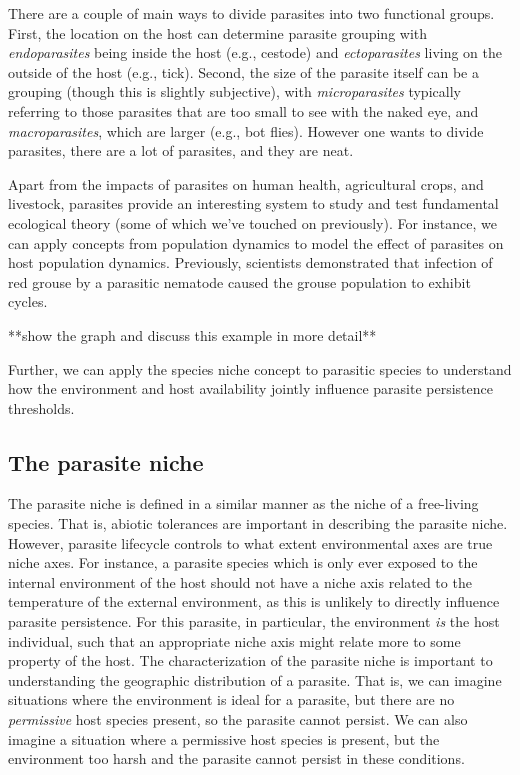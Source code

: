 \documentclass[12pt]{article}
\begin{document}
There are a couple of main ways to divide parasites into two functional groups. First, the location on the host can determine parasite grouping with \textit{endoparasites} being inside the host (e.g., cestode) and \textit{ectoparasites} living on the outside of the host (e.g., tick). Second, the size of the parasite itself can be a grouping (though this is slightly subjective), with \textit{microparasites} typically referring to those parasites that are too small to see with the naked eye, and \textit{macroparasites}, which are larger (e.g., bot flies). However one wants to divide parasites, there are a lot of parasites, and they are neat. 


Apart from the impacts of parasites on human health, agricultural crops, and livestock, parasites provide an interesting system to study and test fundamental ecological theory (some of which we've touched on previously). For instance, we can apply concepts from population dynamics to model the effect of parasites on host population dynamics. Previously, scientists demonstrated that infection of red grouse by a parasitic nematode caused the grouse population to exhibit cycles. 


**show the graph and discuss this example in more detail**



Further, we can apply the species niche concept to parasitic species to understand how the environment and host availability jointly influence parasite persistence thresholds. 
















\bigskip
\subsection*{The parasite niche}

The parasite niche is defined in a similar manner as the niche of a free-living species. That is, abiotic tolerances are important in describing the parasite niche. However, parasite lifecycle controls to what extent environmental axes are true niche axes. For instance, a parasite species which is only ever exposed to the internal environment of the host should not have a niche axis related to the temperature of the external environment, as this is unlikely to directly influence parasite persistence. For this parasite, in particular, the environment \textit{is} the host individual, such that an appropriate niche axis might relate more to some property of the host. The characterization of the parasite niche is important to understanding the geographic distribution of a parasite. That is, we can imagine situations where the environment is ideal for a parasite, but there are no \textit{permissive} host species present, so the parasite cannot persist. We can also imagine a situation where a permissive host species is present, but the environment too harsh and the parasite cannot persist in these conditions. 
\end{document}
